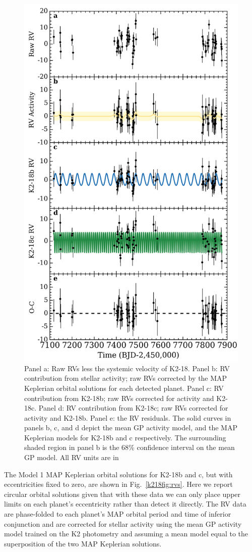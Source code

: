 \begin{figure}
  \centering
  \includegraphics[width=0.8\hsize]{figures/fullRVs.png}%
  \caption{Panel a: Raw RVs less the systemic velocity of
    K2-18. Panel b: RV contribution from stellar activity; raw RVs
    corrected by the MAP Keplerian orbital solutions for each detected planet.
    Panel c: RV contribution from K2-18b; raw RVs corrected for
    activity and K2-18c.
    Panel d: RV contribution from K2-18c; raw RVs corrected for
    activity and K2-18b. Panel e: the RV residuals.
    The solid curves in panels b, c, and d depict the mean GP activity model,
    and the MAP Keplerian models for K2-18b and c respectively.
    The surrounding shaded region in panel b is the 68\% confidence interval on the mean
    GP model. All RV units are in }
  \label{k218fig:fullrvs}
\end{figure}


The Model 1 MAP Keplerian orbital solutions for K2-18b and c, but with eccentricities fixed to zero,
are shown in Fig.~\ref{k218fig:rvs}. Here we report circular orbital solutions given that with these data we can
only place upper limits on each planet's eccentricity rather than detect it directly.
The RV data are phase-folded to each planet's MAP orbital period and
time of inferior conjunction and are corrected for stellar activity using the mean GP activity model trained
on the K2 photometry and assuming a mean model equal to the superposition of the two MAP Keplerian solutions. 

